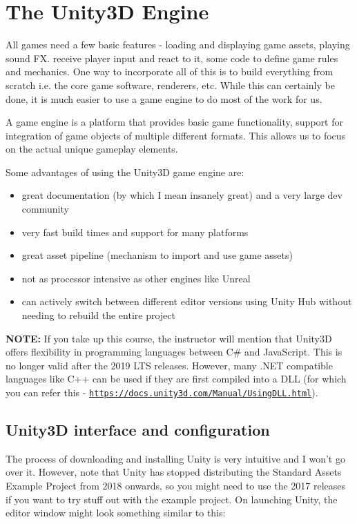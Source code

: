 \documentclass{article}[a4paper,12pt]
\theoremstyle{definition}
\begin{document}
\section{The Unity3D Engine}
All games need a few basic features - loading and displaying game assets, playing sound FX. receive player input and react to it, some code to define game rules and mechanics. One way to incorporate all of this is to build everything from scratch i.e. the core game software, renderers, etc. While this can certainly be done, it is much easier to use a game engine to do most of the work for us.
\vspace{6pt}

A game engine is a platform that provides basic game functionality, support for integration of game objects of multiple different formats. This allows us to focus on the actual unique gameplay elements.
\vspace{6pt}

Some advantages of using the Unity3D game engine are:
\begin{itemize}
 	\item great documentation (by which I mean insanely great) and a very large dev community
	\item very fast build times and support for many platforms
	\item great asset pipeline (mechanism to import and use game assets)
	\item not as processor intensive as other engines like Unreal
	\item can actively switch between different editor versions using Unity Hub without needing to rebuild the entire project
\end{itemize}
\textbf{NOTE:} If you take up this course, the instructor will mention that Unity3D offers flexibility in programming languages between C\# and JavaScript. This is no longer valid after the 2019 LTS releases. However, many .NET compatible languages like C++ can be used if they are first compiled into a DLL (for which you can refer this - \texttt{\href{https://docs.unity3d.com/Manual/UsingDLL.html}{https://docs.unity3d.com/Manual/UsingDLL.html}}).
\subsection{Unity3D interface and configuration}
The process of downloading and installing Unity is very intuitive and I won't go over it. However, note that Unity has stopped distributing the Standard Assets Example Project from 2018 onwards, so you might need to use the 2017 releases if you want to try stuff out with the example project. On launching Unity, the editor window might look something similar to this:
\vspace{6pt}
\end{document}
